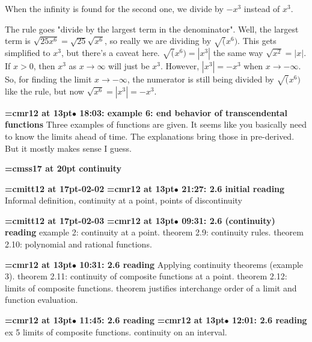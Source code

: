 When the infinity is found for the second one, we divide by $-x^3$ instead of $x^3$.
\par

The rule goes "divide by the largest term in the denominator". Well, the largest term is $\sqrt{25x^6} = \sqrt{25}\sqrt{x^6}$, so really we are dividing by $\sqrt(x^6)$. This gets simplified to $x^3$, but there's a caveat here. $\sqrt(x^6) = |x^3|$ the same way $\sqrt{x^2} = |x|$. If $x > 0$, then $x^3$ as $x \to \infty$ will just be $x^3$. However, $|x^3| = -x^3$ when $x \to -\infty$. So, for finding the limit $x \to -\infty$, the numerator is still being divided by $\sqrt(x^6)$ like the rule, but now $\sqrt{x^6}=|x^3|=-x^3$.
\par

{\smallskip\noindent\bf\font\titlefont=cmr12 at 13pt\titlefont $\bullet$ 18:03: example 6: end behavior of transcendental functions}\smallskip
Three examples of functions are given. It seems like you basically need to know the limits ahead of time. The explanations bring those in pre-derived. But it mostly makes sense I guess.
\par

{\medskip\noindent\bf\font\titlefont=cmss17 at 20pt continuity}\medskip

{\medskip\noindent\bf\font\titlefont=cmitt12 at 17pt-02-02}\medskip
{\smallskip\noindent\bf\font\titlefont=cmr12 at 13pt\titlefont $\bullet$ 21:27: 2.6 initial reading}\smallskip
Informal definition, continuity at a point, points of discontinuity
\par

{\medskip\noindent\bf\font\titlefont=cmitt12 at 17pt-02-03}\medskip
{\smallskip\noindent\bf\font\titlefont=cmr12 at 13pt\titlefont $\bullet$ 09:31: 2.6 (continuity) reading}\smallskip
example 2: continuity at a point. theorem 2.9: continuity rules. theorem 2.10: polynomial and rational functions.
\par

{\smallskip\noindent\bf\font\titlefont=cmr12 at 13pt\titlefont $\bullet$ 10:31: 2.6 reading}\smallskip
Applying continuity theorems (example 3). theorem 2.11: continuity of composite functions at a point. theorem 2.12: limits of composite functions. theorem justifies interchange order of a limit and function evaluation.
\par

{\smallskip\noindent\bf\font\titlefont=cmr12 at 13pt\titlefont $\bullet$ 11:45: 2.6 reading}\smallskip
{\smallskip\noindent\bf\font\titlefont=cmr12 at 13pt\titlefont $\bullet$ 12:01: 2.6 reading}\smallskip
ex 5 limits of composite functions. continuity on an interval.
\par

